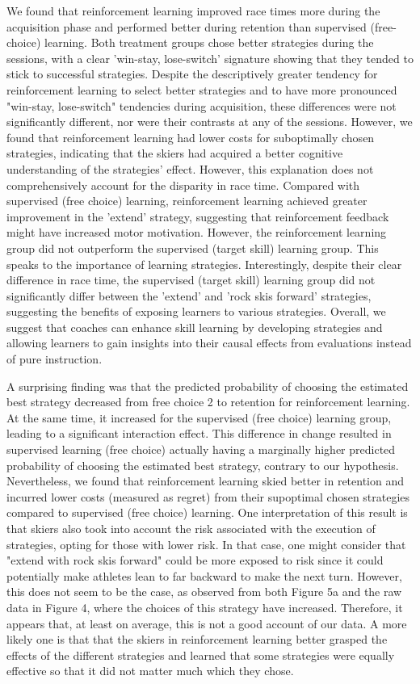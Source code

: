 
We found that reinforcement learning improved race times more during the acquisition phase and performed better during retention than supervised (free-choice) learning. Both treatment groups chose better strategies during the sessions, with a clear 'win-stay, lose-switch' signature showing that they tended to stick to successful strategies. Despite the descriptively greater tendency for reinforcement learning to select better strategies and to have more pronounced "win-stay, lose-switch" tendencies during acquisition, these differences were not significantly different, nor were their contrasts at any of the sessions. However, we found that reinforcement learning had lower costs for suboptimally chosen strategies, indicating that the skiers had acquired a better cognitive understanding of the strategies' effect. However, this explanation does not comprehensively account for the disparity in race time. Compared with supervised (free choice) learning, reinforcement learning achieved greater improvement in the 'extend' strategy, suggesting that reinforcement feedback might have increased motor motivation. However, the reinforcement learning group did not outperform the supervised (target skill) learning group. This speaks to the importance of learning strategies. Interestingly, despite their clear difference in race time, the supervised (target skill) learning group did not significantly differ between the 'extend' and 'rock skis forward' strategies, suggesting the benefits of exposing learners to various strategies. Overall, we suggest that coaches can enhance skill learning by developing strategies and allowing learners to gain insights into their causal effects from evaluations instead of pure instruction.



A surprising finding was that the predicted probability of choosing the estimated best strategy decreased from free choice 2 to retention for reinforcement learning. At the same time, it increased for the supervised (free choice) learning group, leading to a significant interaction effect. This difference in change resulted in supervised learning (free choice) actually having a marginally higher predicted probability of choosing the estimated best strategy, contrary to our hypothesis. Nevertheless, we found that reinforcement learning skied better in retention and incurred lower costs (measured as regret) from their supoptimal chosen strategies compared to supervised (free choice) learning. One interpretation of this result is that skiers also took into account the risk associated with the execution of strategies, opting for those with lower risk. In that case, one might consider that "extend with rock skis forward" could be more exposed to risk since it could potentially make athletes lean to far backward to make the next turn.  However, this does not seem to be the case, as observed from both Figure 5a and the raw data in Figure 4, where the choices of this strategy have increased. Therefore, it appears that, at least on average, this is not a good account of our data. A more likely one is that that the skiers in reinforcement learning better grasped the effects of the different strategies and learned that some strategies were equally effective so that it did not matter much which they chose.

